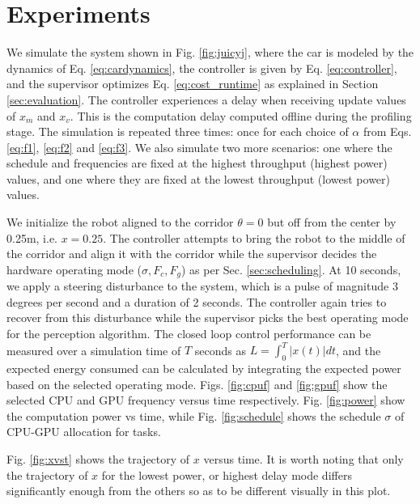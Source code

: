 \section{Experiments}
\label{sec:simResults}

We simulate the system shown in Fig. \ref{fig:juicyj}, where the car is modeled by the dynamics of Eq. \eqref{eq:cardynamics}, the controller is given by Eq. \eqref{eq:controller}, and the supervisor optimizes Eq. \ref{eq:cost_runtime} as explained in Section \ref{sec:evaluation}. 
The controller experiences a delay when receiving update values of $x_m$ and $x_v$. 
This is the computation delay computed offline during the profiling stage. 
The simulation is repeated three times: once for each choice of $\alpha$ from Eqs. \eqref{eq:f1}, \eqref{eq:f2} and \eqref{eq:f3}.
We also simulate two more scenarios: one where the schedule and frequencies are fixed at the highest throughput (highest power) values, and one where they are fixed at the lowest throughput (lowest power) values.

We initialize the robot aligned to the corridor $\theta=0$ but off from the center by 0.25m, i.e. $x=0.25$. 
The controller attempts to bring the robot to the middle of the corridor and align it with the corridor while the supervisor decides the hardware operating mode ($\sigma,F_c,F_g$) as per Sec. \ref{sec:scheduling}. 
At 10 seconds, we apply a steering disturbance to the system, which is a pulse of magnitude 3 degrees per second and a duration of 2 seconds. 
The controller again tries to recover from this disturbance while the supervisor picks the best operating mode for the perception algorithm. 
The closed loop control performance can be measured over a simulation time of $T$ seconds as $L = \int_0^T |x(t)|dt$, 
and the expected energy consumed can be calculated by integrating the expected power based on the selected operating mode. 
Figs. \ref{fig:cpuf} and \ref{fig:gpuf} show the selected CPU and GPU frequency versus time respectively. 
Fig. \ref{fig:power} show the computation power vs time, while Fig. \ref{fig:schedule} shows the schedule $\sigma$ of CPU-GPU allocation for tasks.

Fig. \ref{fig:xvst} shows the trajectory of $x$ versus time.  
It is worth noting that only the trajectory of $x$ for the lowest power, or highest delay mode differs significantly enough from the others so as to be different visually in this plot.


